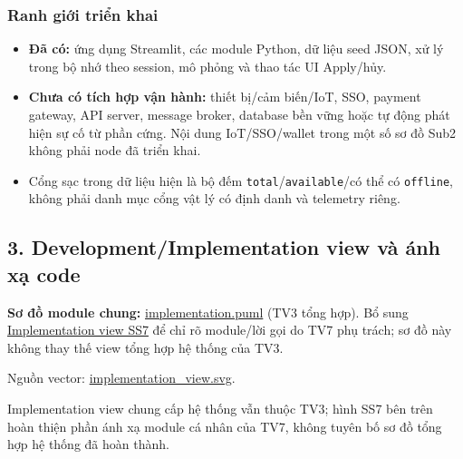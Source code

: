 \documentclass[11pt,a4paper]{article}
\providecommand{\tightlist}{%
  \setlength{\itemsep}{0pt}\setlength{\parskip}{0pt}}
\begin{document}
\hypertarget{ranh-giux1edbi-triux1ec3n-khai}{%
\subsubsection{Ranh giới triển
khai}\label{ranh-giux1edbi-triux1ec3n-khai}}

\begin{itemize}
\tightlist
\item
  \textbf{Đã có:} ứng dụng Streamlit, các module Python, dữ liệu seed
  JSON, xử lý trong bộ nhớ theo session, mô phỏng và thao tác UI
  Apply/hủy.
\item
  \textbf{Chưa có tích hợp vận hành:} thiết bị/cảm biến/IoT, SSO,
  payment gateway, API server, message broker, database bền vững hoặc tự
  động phát hiện sự cố từ phần cứng. Nội dung IoT/SSO/wallet trong một
  số sơ đồ Sub2 không phải node đã triển khai.
\item
  Cổng sạc trong dữ liệu hiện là bộ đếm
  \texttt{total}/\texttt{available}/có thể có \texttt{offline}, không
  phải danh mục cổng vật lý có định danh và telemetry riêng.
\end{itemize}

\hypertarget{developmentimplementation-view-vuxe0-uxe1nh-xux1ea1-code}{%
\subsection{3. Development/Implementation view và ánh xạ
code}\label{developmentimplementation-view-vuxe0-uxe1nh-xux1ea1-code}}

\textbf{Sơ đồ module chung:}
\href{../../../diagrams/submission_3/shared/implementation.puml}{implementation.puml}
(TV3 tổng hợp). Bổ sung
\href{../../../diagrams/submission_3/SS7/implementation_view.puml}{Implementation
view SS7} để chỉ rõ module/lời gọi do TV7 phụ trách; sơ đồ này không
thay thế view tổng hợp hệ thống của TV3.

Nguồn vector:
\href{../../../diagrams/submission_3/SS7/implementation_view.svg}{implementation\_view.svg}.

Implementation view chung cấp hệ thống vẫn thuộc TV3; hình SS7 bên trên
hoàn thiện phần ánh xạ module cá nhân của TV7, không tuyên bố sơ đồ tổng
hợp hệ thống đã hoàn thành.
\end{document}

